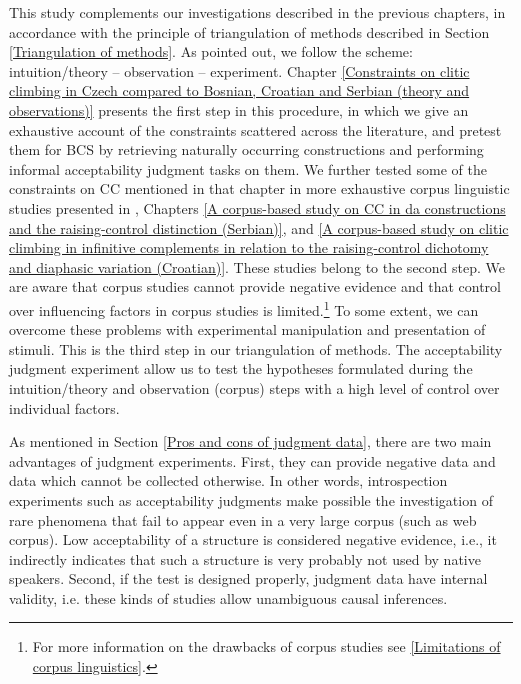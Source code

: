 This study complements our investigations described in the previous chapters, in accordance with the principle of triangulation of methods described in Section \ref{Triangulation of methods}. As pointed out, we follow the scheme: intuition/theory – observation – experiment. Chapter \ref{Constraints on clitic climbing in Czech compared to Bosnian, Croatian and Serbian (theory and observations)} presents the first step in this procedure, in which we give an exhaustive account of the constraints scattered across the literature, and pretest them for BCS by retrieving naturally occurring constructions and performing informal acceptability judgment tasks on them. We further tested some of the constraints on CC mentioned in that chapter in more exhaustive corpus linguistic studies presented in \citet*{HKJ18}, Chapters \ref{A corpus-based study on CC in da constructions and the raising-control distinction (Serbian)}, and \ref{A corpus-based study on clitic climbing in infinitive complements in relation to the raising-control dichotomy and diaphasic variation (Croatian)}. These studies belong to the second step. We are aware that corpus studies cannot provide negative evidence and that control over influencing factors in corpus studies is limited.\footnote{For more information on the drawbacks of corpus studies see \ref{Limitations of corpus linguistics}.} To some extent, we can overcome these problems with experimental manipulation and presentation of stimuli. This is the third step in our triangulation of methods. The acceptability judgment experiment allow us to test the hypotheses formulated during the intuition/theory and observation (corpus) steps with a high level of control over individual factors.

As mentioned in Section \ref{Pros and cons of judgment data}, there are two main advantages of judgment experiments. First, they can provide negative data and data which cannot be collected otherwise. In other words, introspection experiments such as acceptability judgments make possible the investigation of rare phenomena that fail to appear even in a very large corpus (such as web corpus). Low acceptability of a structure is considered negative evidence, i.e., it indirectly indicates that such a structure is very probably not used by native speakers. Second, if the test is designed properly, judgment data have internal validity, i.e. these kinds of studies allow unambiguous causal inferences. 

